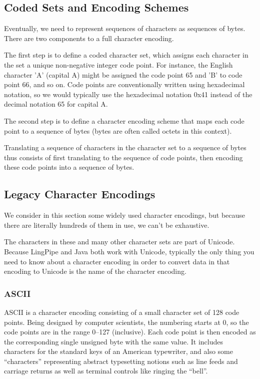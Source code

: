 \subsection{Coded Sets and Encoding Schemes}

Eventually, we need to represent sequences of characters as sequences
of bytes.  There are two components to a full character encoding.

The first step is to define a coded character set, which assigns each
character in the set a unique non-negative integer code point.  For
instance, the English character 'A' (capital A) might be assigned the
code point 65 and 'B' to code point 66, and so on.  Code points are
conventionally written using hexadecimal notation, so we would
typically use the hexadecimal notation 0x41 instead of the decimal
notation 65 for capital A.

The second step is to define a character encoding scheme that maps
each code point to a sequence of bytes (bytes are often called octets
in this context).

Translating a sequence of characters in the character set to a
sequence of bytes thus consists of first translating to the sequence
of code points, then encoding these code points into a sequence of
bytes.


\subsection{Legacy Character Encodings}

We consider in this section some widely used character encodings, but
because there are literally hundreds of them in use, we can't be
exhaustive.  

The characters in these and many other character sets are part of
Unicode.  Because LingPipe and Java both work with Unicode, typically
the only thing you need to know about a character encoding in order
to convert data in that encoding to Unicode is the name of the
character encoding.

\subsubsection{ASCII}\label{section:ascii}

ASCII is a character encoding consisting of a small character set of
128 code points.  Being designed by computer scientists, the numbering
starts at 0, so the code points are in the range 0--127 (inclusive).
Each code point is then encoded as the corresponding single unsigned
byte with the same value.  It includes characters for the standard
keys of an American typewriter, and also some ``characters''
representing abstract typesetting notions such as line feeds and
carriage returns as well as terminal controls like ringing the
``bell''.

